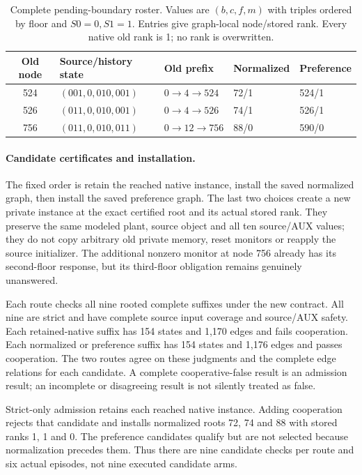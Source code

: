 \begin{table}[htbp]
\centering\small
\caption{Complete pending-boundary roster. Values are $(b,c,f,m)$ with
triples ordered by floor and $S0=0,S1=1$. Entries give graph-local
node/stored rank. Every native old rank is 1; no rank is overwritten.}
\label{tab:pending-native-roster}
\begin{tabular}{@{}cllll@{}}
\toprule
Old node & Source/history state & Old prefix & Normalized & Preference\\
\midrule
524 & $(001,0,010,001)$ & $0\to4\to524$ & 72/1 & 524/1\\
526 & $(011,0,010,001)$ & $0\to4\to526$ & 74/1 & 526/1\\
756 & $(011,0,010,011)$ & $0\to12\to756$ & 88/0 & 590/0\\
\bottomrule
\end{tabular}
\end{table}

\paragraph{Candidate certificates and installation.}
The fixed order is retain the reached native instance, install the saved
normalized graph, then install the saved preference graph. The last two
choices create a new private instance at the exact certified root and
its actual stored rank. They preserve the same modeled plant, source
object and all ten source/AUX values; they do not copy arbitrary old
private memory, reset monitors or reapply the source initializer.
The additional nonzero monitor at node 756 already has its second-floor
response, but its third-floor obligation remains genuinely unanswered.

Each route checks all nine rooted complete suffixes under the new
contract. All nine are strict and have complete source input coverage
and source/AUX safety. Each retained-native suffix has 154 states and
1,170 edges and fails cooperation. Each normalized or preference suffix
has 154 states and 1,176 edges and passes cooperation. The two routes
agree on these judgments and the complete edge relations for each
candidate. A complete cooperative-false result is an admission result;
an incomplete or disagreeing result is not silently treated as false.

Strict-only admission retains each reached native instance. Adding
cooperation rejects that candidate and installs normalized roots 72, 74
and 88 with stored ranks 1, 1 and 0. The preference candidates qualify
but are not selected because normalization precedes them. Thus there
are nine candidate checks per route and six actual episodes, not nine
executed candidate arms.

